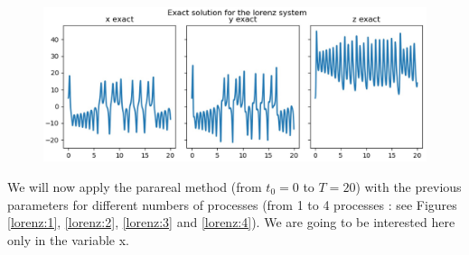 \begin{figure}[H]  
	\centering     
	\includegraphics[width=\linewidth]{"images/parareal/lorenz_exact.jpg"}
	\label{lorenz:exact}
\end{figure}

\noindent We will now apply the parareal method (from $t_0=0$ to $T=20$) with the previous parameters for different numbers of processes (from 1 to 4 processes : see Figures \ref{lorenz:1}, \ref{lorenz:2}, \ref{lorenz:3} and \ref{lorenz:4}). We are going to be interested here only in the variable x.

